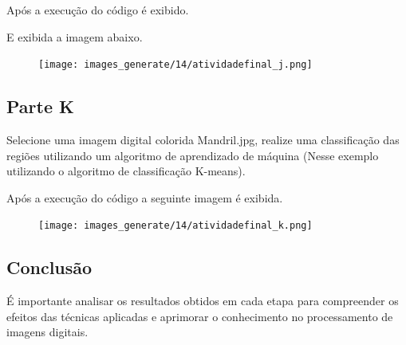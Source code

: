 \documentclass[10pt,a4paper]{article}
\begin{document}


Após a execução do código é exibido.



E exibida a imagem abaixo.

\begin{figure}[H]
    \centering
    {{\texttt{[image: images\_generate/14/atividadefinal\_j.png]}}}
\end{figure}

\subsection{Parte K}

Selecione uma imagem digital colorida Mandril.jpg, realize uma classificação das regiões utilizando um algoritmo de aprendizado de máquina (Nesse exemplo utilizando o algoritmo de classificação K-means).



Após a execução do código a seguinte imagem é exibida.

\begin{figure}[H]
    \centering
    {{\texttt{[image: images\_generate/14/atividadefinal\_k.png]}}}
\end{figure}

\subsection{Conclusão}

É importante analisar os resultados obtidos em cada etapa para compreender os efeitos das técnicas aplicadas e aprimorar o conhecimento no processamento de imagens digitais.
\end{document}
